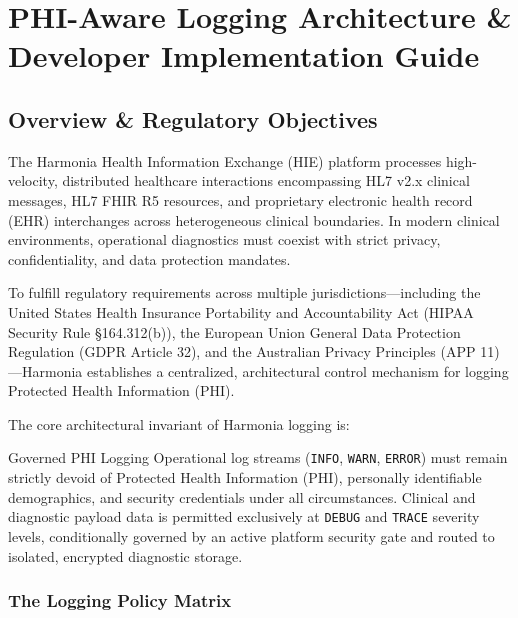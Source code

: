 
\chapter{PHI-Aware Logging Architecture \& Developer Implementation Guide}
\label{app:phi_logging}

\section{Overview \& Regulatory Objectives}
\label{sec:phi_logging_overview}

The Harmonia Health Information Exchange (HIE) platform processes high-velocity, distributed healthcare interactions encompassing HL7 v2.x clinical messages, HL7 FHIR R5 resources, and proprietary electronic health record (EHR) interchanges across heterogeneous clinical boundaries. In modern clinical environments, operational diagnostics must coexist with strict privacy, confidentiality, and data protection mandates.

To fulfill regulatory requirements across multiple jurisdictions---including the United States Health Insurance Portability and Accountability Act (HIPAA Security Rule \S164.312(b)), the European Union General Data Protection Regulation (GDPR Article 32), and the Australian Privacy Principles (APP 11)---Harmonia establishes a centralized, architectural control mechanism for logging Protected Health Information (PHI).

The core architectural invariant of Harmonia logging is:
\begin{principlebox}{Governed PHI Logging}
Operational log streams (\texttt{INFO}, \texttt{WARN}, \texttt{ERROR}) must remain strictly devoid of Protected Health Information (PHI), personally identifiable demographics, and security credentials under all circumstances. Clinical and diagnostic payload data is permitted exclusively at \texttt{DEBUG} and \texttt{TRACE} severity levels, conditionally governed by an active platform security gate and routed to isolated, encrypted diagnostic storage.
\end{principlebox}

\subsection{The Logging Policy Matrix}

